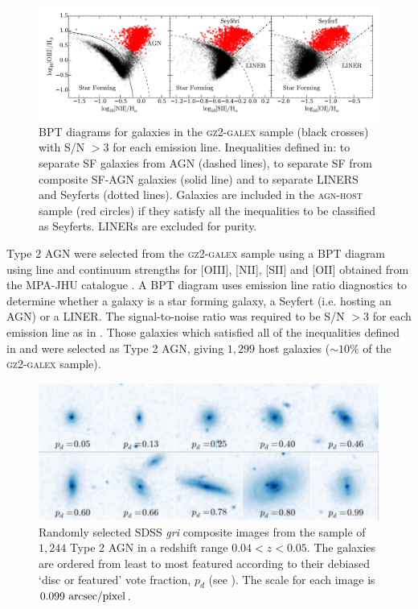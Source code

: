 \begin{figure}
\includegraphics[width=\textwidth]{agn/fig2.pdf}
\caption[BPT diagram used to select AGN host galaxies]{BPT diagrams for galaxies in the \textsc{gz2-galex} sample (black crosses) with S/N $> 3$ for each emission line. Inequalities defined in: \protect\cite{kewley01} to separate SF galaxies from AGN (dashed lines), \protect\cite{kauffmann03b} to separate SF from composite SF-AGN galaxies (solid line) and \protect\cite{kewley06} to separate LINERS and Seyferts (dotted lines). Galaxies are included in the \textsc{agn-host} sample (red circles) if they satisfy all the inequalities to be classified as Seyferts. LINERs are excluded for purity.}
\label{bpt}
\end{figure}

Type 2 AGN were selected from the \textsc{gz2-galex} sample using a BPT diagram \citep{bpt} using line and continuum strengths for [OIII], [NII], [SII] and [OII] obtained from the MPA-JHU catalogue \citep{kauffmann03, brinchmann04}. A BPT diagram uses emission line ratio diagnostics to determine whether a galaxy is a star forming galaxy, a Seyfert (i.e. hosting an AGN) or a LINER. The signal-to-noise ratio was required to be S/N $> 3$ for each emission line as in \cite{schawinski10a}. Those galaxies which satisfied all of the inequalities defined in \citet[][to separate SF galaxies from AGN]{kewley01} and \citet[][to separate SF galaxies from composite SF-AGN galaxies]{kauffmann03b} were selected as Type 2 AGN, giving $1,299$ host galaxies ($\sim10\%$ of the \textsc{gz2-galex} sample).

\begin{figure}
\includegraphics[width=\textwidth]{agn/fig1.pdf}
\caption[SDSS images of galaxies in the \textsc{agn-host} sample]{Randomly selected SDSS \emph{gri} composite images from the sample of $1,244$ Type 2 AGN in a redshift range $0.04 < z < 0.05$.  The galaxies are ordered from least to most featured according to their debiased `disc or featured' vote fraction, $p_d$ (see \citealt{GZ2}). The scale for each image is $0.099~\rm{arcsec/pixel}$.}
\label{mosaic}
\end{figure}



